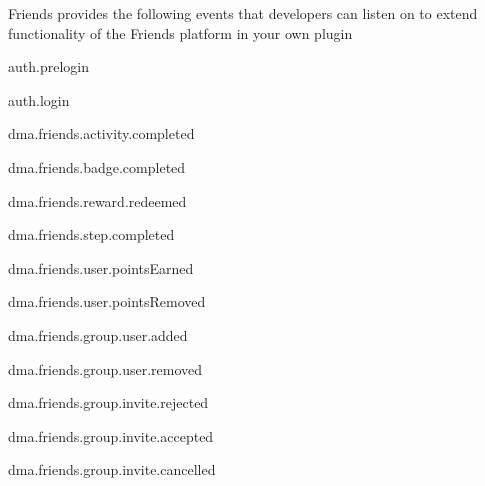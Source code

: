 Friends provides the following events that developers can listen on to extend functionality of the Friends platform in your own plugin


\begin{DoxyItemize}
\item auth.\+prelogin
\item auth.\+login
\item dma.\+friends.\+activity.\+completed
\item dma.\+friends.\+badge.\+completed
\item dma.\+friends.\+reward.\+redeemed
\item dma.\+friends.\+step.\+completed
\item dma.\+friends.\+user.\+points\+Earned
\item dma.\+friends.\+user.\+points\+Removed
\item dma.\+friends.\+group.\+user.\+added
\item dma.\+friends.\+group.\+user.\+removed
\item dma.\+friends.\+group.\+invite.\+rejected
\item dma.\+friends.\+group.\+invite.\+accepted
\item dma.\+friends.\+group.\+invite.\+cancelled 
\end{DoxyItemize}